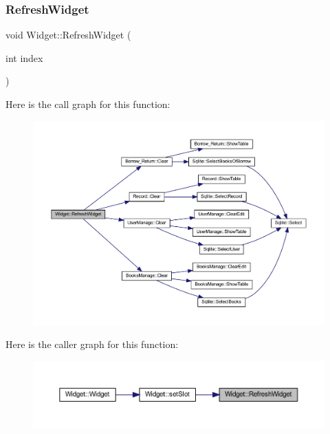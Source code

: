 \subsubsection{\texorpdfstring{RefreshWidget}{RefreshWidget}}
{\footnotesize\ttfamily void Widget\+::\+Refresh\+Widget (\begin{DoxyParamCaption}\item[{int}]{index }\end{DoxyParamCaption})\hspace{0.3cm}{\ttfamily [slot]}}

Here is the call graph for this function\+:
\nopagebreak
\begin{figure}[H]
\begin{center}
\leavevmode
\includegraphics[width=350pt]{class_widget_a07120b41431597f8e2d0eb86098a6ba7_cgraph}
\end{center}
\end{figure}
Here is the caller graph for this function\+:
\nopagebreak
\begin{figure}[H]
\begin{center}
\leavevmode
\includegraphics[width=350pt]{class_widget_a07120b41431597f8e2d0eb86098a6ba7_icgraph}
\end{center}
\end{figure}
\mbox{\label{class_widget_ac611086a6f74fe7bab712f23ab7126d8}} 
